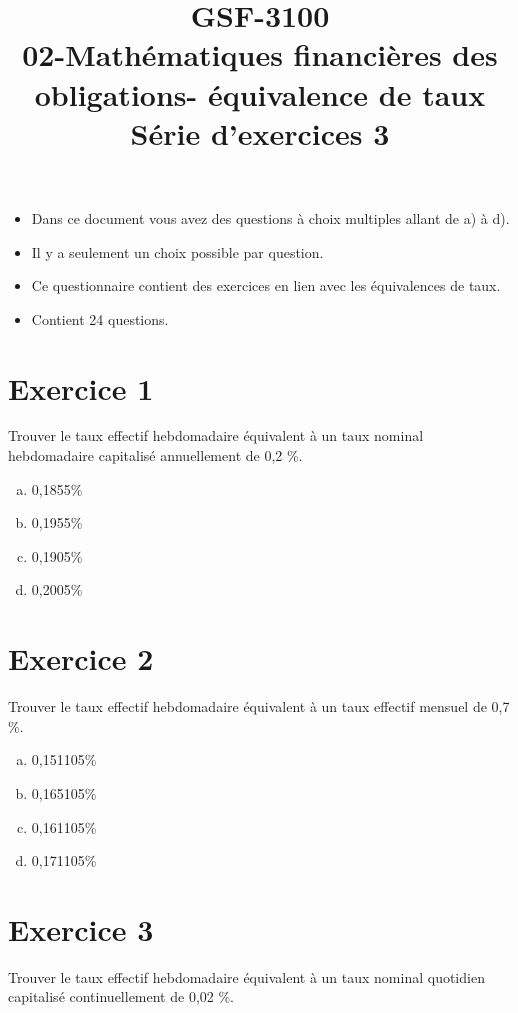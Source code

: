\documentclass[10pt,a4paper]{article}
\title{GSF-3100 \\
02-Mathématiques financières des obligations- équivalence de taux \\
Série d'exercices 3}
\begin{document}
\maketitle

\begin{itemize}
\item Dans ce document vous avez des questions à choix multiples allant de a) à d).  
\item Il y a seulement un choix possible par question.
\item Ce questionnaire contient des exercices en lien avec les équivalences de taux.
\item Contient 24 questions. 
\end{itemize}
 





\newpage

\section*{Exercice 1}
Trouver le taux effectif hebdomadaire équivalent à un taux nominal hebdomadaire capitalisé annuellement de 0,2 \%.


\begin{enumerate}[a)]
\item 0,1855\%
\item 0,1955\%
\item 0,1905\%
\item 0,2005\%
\end{enumerate}

\section*{Exercice 2}
Trouver le taux effectif hebdomadaire équivalent à un taux effectif mensuel de 0,7 \%.


\begin{enumerate}[a)]
\item 0,151105\%
\item 0,165105\%
\item 0,161105\%
\item 0,171105\%
\end{enumerate}

\section*{Exercice 3}
Trouver le taux effectif hebdomadaire équivalent à un taux nominal quotidien capitalisé continuellement de 0,02 \%.
\end{document}

